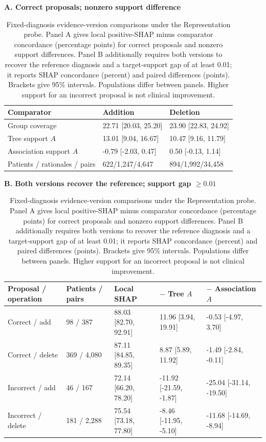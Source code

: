 \begin{table}[!tbp]\centering\scriptsize
\caption{Fixed-diagnosis evidence-version comparisons under the Representation probe. Panel A gives local positive-SHAP minus comparator concordance (percentage points) for correct proposals and nonzero support differences. Panel B additionally requires both versions to recover the reference diagnosis and a target-support gap of at least 0.01; it reports SHAP concordance (percent) and paired differences (points). Brackets give 95\% intervals. Populations differ between panels. Higher support for an incorrect proposal is not clinical improvement.}
\label{tab:version-support-contrasts}\label{tab:versions-bothcorrect}
\textbf{A. Correct proposals; nonzero support difference}\par\smallskip
\begin{tabular}{lll}\toprule
Comparator & Addition & Deletion \\ \midrule
Group coverage & 22.71 [20.03, 25.20] & 23.90 [22.83, 24.92] \\
Tree support $A$ & 13.01 [9.04, 16.67] & 10.47 [9.16, 11.79] \\
Association support $A$ & -0.79 [-2.03, 0.47] & 0.50 [-0.13, 1.14] \\
\midrule
Patients / rationales / pairs & 622/1,247/4,647 & 894/1,992/34,458 \\
\bottomrule\end{tabular}
\par\medskip
\textbf{B. Both versions recover the reference; support gap $\geq0.01$}\par\smallskip
\begin{tabular}{lllll}\toprule
Proposal / operation & Patients / pairs & Local SHAP & $-$ Tree $A$ & $-$ Association $A$ \\ \midrule
Correct / add & 98 / 387 & 88.03 [82.70, 92.91] & 11.96 [3.94, 19.91] & -0.53 [-4.97, 3.70] \\
Correct / delete & 369 / 4,080 & 87.11 [84.85, 89.35] & 8.87 [5.89, 11.92] & -1.49 [-2.84, -0.11] \\
Incorrect / add & 46 / 167 & 72.14 [66.20, 78.20] & -11.92 [-21.59, -1.87] & -25.04 [-31.14, -19.50] \\
Incorrect / delete & 181 / 2,288 & 75.54 [73.18, 77.80] & -8.46 [-11.95, -5.10] & -11.68 [-14.69, -8.94] \\
\bottomrule\end{tabular}
\end{table}
